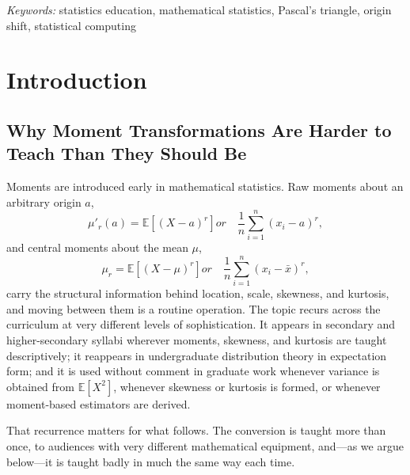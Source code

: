 \documentclass[
  12pt]{article}
\begin{document}
\noindent%
{\it Keywords:} statistics education, mathematical statistics, Pascal's triangle, origin shift, statistical computing
\vfill

\newpage
{} %

\section{Introduction}\label{sec-intro}

\subsection{Why Moment Transformations Are Harder to Teach Than They Should Be}

Moments are introduced early in mathematical statistics. Raw moments about an arbitrary origin $a$,
\[
\mu'_r(a) = \mathbb{E}[(X - a)^r] or \quad \frac{1}{n} \sum_{i=1}^n (x_i - a)^r, 
\]
and central moments about the mean $\mu$,
\[
\mu_r = \mathbb{E}[(X - \mu)^r] or \quad \frac{1}{n} \sum_{i=1}^n (x_i - \bar x)^r,
\]
carry the structural information behind location, scale, skewness, and kurtosis, and moving between them is a routine operation. The topic recurs across the curriculum at very different levels of sophistication. It appears in secondary and higher-secondary syllabi wherever moments, skewness, and kurtosis are taught descriptively; it reappears in undergraduate distribution theory in expectation form; and it is used without comment in graduate work whenever variance is obtained from $\mathbb{E}[X^2]$, whenever skewness or kurtosis is formed, or whenever moment-based estimators are derived.

That recurrence matters for what follows. The conversion is taught more than once, to audiences with very different mathematical equipment, and---as we argue below---it is taught badly in much the same way each time.
\end{document}
